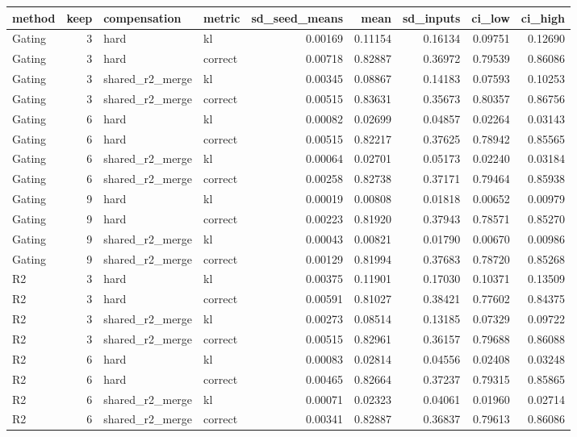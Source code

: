 \begin{tabular}{lrllrrrrr}
\toprule
method & keep & compensation & metric & sd_seed_means & mean & sd_inputs & ci_low & ci_high \\
\midrule
Gating & 3 & hard & kl & 0.00169 & 0.11154 & 0.16134 & 0.09751 & 0.12690 \\
Gating & 3 & hard & correct & 0.00718 & 0.82887 & 0.36972 & 0.79539 & 0.86086 \\
Gating & 3 & shared_r2_merge & kl & 0.00345 & 0.08867 & 0.14183 & 0.07593 & 0.10253 \\
Gating & 3 & shared_r2_merge & correct & 0.00515 & 0.83631 & 0.35673 & 0.80357 & 0.86756 \\
Gating & 6 & hard & kl & 0.00082 & 0.02699 & 0.04857 & 0.02264 & 0.03143 \\
Gating & 6 & hard & correct & 0.00515 & 0.82217 & 0.37625 & 0.78942 & 0.85565 \\
Gating & 6 & shared_r2_merge & kl & 0.00064 & 0.02701 & 0.05173 & 0.02240 & 0.03184 \\
Gating & 6 & shared_r2_merge & correct & 0.00258 & 0.82738 & 0.37171 & 0.79464 & 0.85938 \\
Gating & 9 & hard & kl & 0.00019 & 0.00808 & 0.01818 & 0.00652 & 0.00979 \\
Gating & 9 & hard & correct & 0.00223 & 0.81920 & 0.37943 & 0.78571 & 0.85270 \\
Gating & 9 & shared_r2_merge & kl & 0.00043 & 0.00821 & 0.01790 & 0.00670 & 0.00986 \\
Gating & 9 & shared_r2_merge & correct & 0.00129 & 0.81994 & 0.37683 & 0.78720 & 0.85268 \\
R2 & 3 & hard & kl & 0.00375 & 0.11901 & 0.17030 & 0.10371 & 0.13509 \\
R2 & 3 & hard & correct & 0.00591 & 0.81027 & 0.38421 & 0.77602 & 0.84375 \\
R2 & 3 & shared_r2_merge & kl & 0.00273 & 0.08514 & 0.13185 & 0.07329 & 0.09722 \\
R2 & 3 & shared_r2_merge & correct & 0.00515 & 0.82961 & 0.36157 & 0.79688 & 0.86088 \\
R2 & 6 & hard & kl & 0.00083 & 0.02814 & 0.04556 & 0.02408 & 0.03248 \\
R2 & 6 & hard & correct & 0.00465 & 0.82664 & 0.37237 & 0.79315 & 0.85865 \\
R2 & 6 & shared_r2_merge & kl & 0.00071 & 0.02323 & 0.04061 & 0.01960 & 0.02714 \\
R2 & 6 & shared_r2_merge & correct & 0.00341 & 0.82887 & 0.36837 & 0.79613 & 0.86086 \\

\end{tabular}
